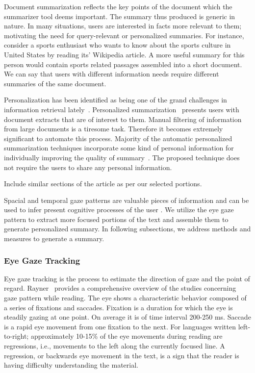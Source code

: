 \documentclass[12pt]{article}
\begin{document}
Document summarization reflects the key points of the document which the summarizer tool deems important. The summary thus produced is generic in nature. In many situations, users are interested in facts more relevant to them; motivating the need for query-relevant or personalized summaries. For instance, consider a sports enthusiast who wants to know about the sports culture in United States by reading its' Wikipedia article. A more useful summary for this person would contain sports related passages assembled into a short document. We can say that users with different information needs require different summaries of the same document.

Personalization has been identified as being one of the grand challenges in information retrieval lately~\cite{belkin2008some}. Personalized summarization~\cite{berkovsky2008aspect} presents users with document extracts that are of interest to them. Manual filtering of information from large documents is a tiresome task. Therefore it becomes extremely significant to automate this process. Majority of the automatic personalized summarization techniques incorporate some kind of personal information for individually improving the quality of summary~\cite{moro2012personalized, wu2008personalized, kumar2008generating}. The proposed technique does not require the users to share any personal information. 

Include similar sections of the article as per our selected portions.


Spacial and temporal gaze patterns are valuable pieces of information and can be used to infer present cognitive processes of the user \cite{Beymer:2005:WSC:1056808.1057055}. We utilize the eye gaze pattern to extract more focused portions of the text and assemble them to generate personalized summary. In following subsections, we address methods and measures to generate a summary.

\subsubsection{Eye Gaze Tracking}
Eye gaze tracking is the process to estimate the direction of gaze and the point of regard. Rayner~\cite{rayner1998eye} provides a comprehensive overview of the studies concerning gaze pattern while reading. The eye shows a characteristic behavior composed of a series of fixations and saccades. Fixation is a duration for which the eye is steadily gazing at one point. On average it is of time interval 200-250 ms. Saccade is a rapid eye movement from one fixation to the next. For languages written left-to-right; approximately 10-15\% of the eye movements during reading are regressions, i.e., movements to the left along the currently focused line. A regression, or backwards eye movement in the text, is a sign that the
reader is having difficulty understanding the material.
\end{document}
